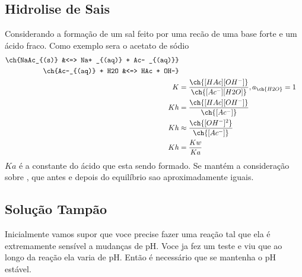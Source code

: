 \subsection{Hidrolise de Sais}
Considerando a formação de um sal feito por uma recão de uma base forte e um ácido fraco. Como
exemplo sera o acetato de sódio
\begin{align}
    \ch{NaAc_{(s)} &<=> Na+ _{(aq)} + Ac- _{(aq)}}\\
    \ch{Ac-_{(aq)} + H2O &<=> HAc + OH-}\\
    K&=\frac{\ch{[HAc][OH^-]}}{\ch{[Ac^-][H2O]}}, a_{\ch{H2O}}=1\\
    Kh&=\frac{\ch{[HAc][OH^-]}}{\ch{[Ac^-]}}\\
    Kh &\approx \frac{\ch{[OH^-]^2}}{\ch{[Ac^-]}}\\
    Kh&=\frac{Kw}{Ka}
\end{align}
\(Ka\) é a constante do ácido que esta sendo formado. Se mantém a consideração sobre \ch{[Ac]^-},
que antes e depois do equilíbrio sao aproximadamente iguais.
\subsection{Solução Tampão}
Inicialmente vamos supor que voce precise fazer uma reação tal que ela é extremamente sensível a
mudanças de pH. Voce ja fez um teste e viu que ao longo da reação ela varia de pH. Então é
necessário que se mantenha o pH estável. \par

